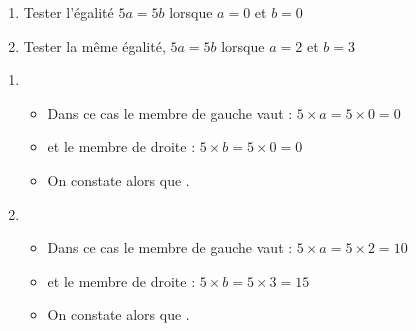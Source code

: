 \begin{exemple*1}
    \begin{enumerate}
    \item Tester l'égalité $5a=5b$ lorsque $a=0$ et $b=0$
    \item Tester la même égalité, $5a=5b$ lorsque $a=2$ et $b=3$
    \end{enumerate}
\correction
    \begin{enumerate}
        \item 
        \begin{itemize}
            \item Dans ce cas le membre de gauche vaut : $5\times a=5\times 0=0$
            \item  et le membre de droite : $5\times b=5\times 0=0$
            \item On constate alors que .
        \end{itemize}
        \item 
        \begin{itemize}
            \item Dans ce cas le membre de gauche vaut : $5\times a=5\times 2=10$
            \item et le membre de droite : $5\times b=5\times3=15$
            \item On constate alors que .
        \end{itemize}
    \end{enumerate}
\end{exemple*1}